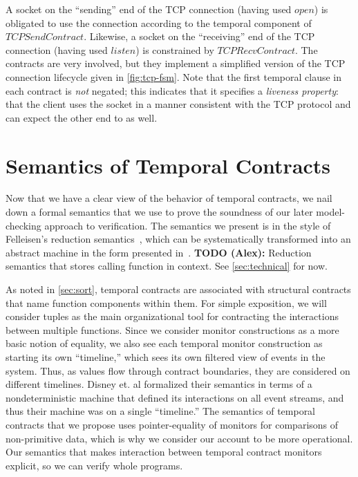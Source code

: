 \documentclass[preprint,onecolumn,9pt]{sigplanconf} %
\begin{document}
A socket on the ``sending'' end of the TCP connection (having used $open$) is obligated to use the connection according to the temporal component of $TCPSendContract$.
%
Likewise, a socket on the ``receiving'' end of the TCP connection (having used $listen$) is constrained by $TCPRecvContract$.
%
The contracts are very involved, but they implement a simplified version of the TCP connection lifecycle given in \autoref{fig:tcp-fsm}.
%
Note that the first temporal clause in each contract is \emph{not} negated; this indicates that it specifies a \emph{liveness property}: that the client uses the socket in a manner consistent with the TCP protocol and can expect the other end to as well.

\section{Semantics of Temporal Contracts}

Now that we have a clear view of the behavior of temporal contracts, we nail down a formal semantics that we use to prove the soundness of our later model-checking approach to verification.
%
The semantics we present is in the style of Felleisen's reduction semantics~\citep{ianjohnson:Felleisen:2009:SEP:1795772}, which can be systematically transformed into an abstract machine in the form presented in~\citet{dvanhorn:VanHorn2010Abstracting}.
%
{\bf TODO (Alex):} Reduction semantics that stores calling function in context.
%
See \autoref{sec:technical} for now.

As noted in \autoref{sec:sort}, temporal contracts are associated with structural contracts that name function components within them.
%
For simple exposition, we will consider tuples as the main organizational tool for contracting the interactions between multiple functions.
%
Since we consider monitor constructions as a more basic notion of equality, we also see each temporal monitor construction as starting its own ``timeline,'' which sees its own filtered view of events in the system.
%
Thus, as values flow through contract boundaries, they are considered on different timelines.
%
Disney et. al formalized their semantics in terms of a nondeterministic machine that defined its interactions on all event streams, and thus their machine was on a single ``timeline.''
%
The semantics of temporal contracts that we propose uses pointer-equality of monitors for comparisons of non-primitive data, which is why we consider our account to be more operational.
%
Our semantics that makes interaction between temporal contract monitors explicit, so we can verify whole programs.
\end{document}

